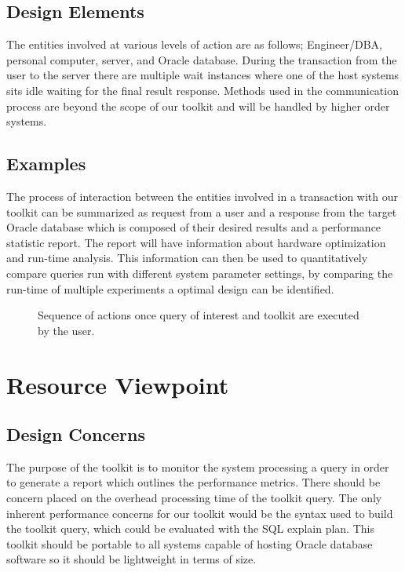 \documentclass[draftclsnofoot, onecolumn, compsoc, 10pt]{IEEEtran}
\begin{document}
\subsection{Design Elements}
The entities involved at various levels of action are as follows; Engineer/DBA, personal computer, server, and Oracle database.
During the transaction from the user to the server there are multiple wait instances where one of the host systems sits idle waiting for the final result response.
Methods used in the communication process are beyond the scope of our toolkit and will be handled by higher order systems.

\subsection{Examples}
The process of interaction between the entities involved in a transaction with our toolkit can be summarized as request from a user and a response from the target Oracle database which is composed of their desired results and a performance statistic report.
The report will have information about hardware optimization and run-time analysis.
This information can then be used to quantitatively compare queries run with different system parameter settings, by comparing the run-time of multiple experiments a optimal design can be identified. 



\begin{figure}[h!]
  \caption{Sequence of actions once query of interest and toolkit are executed by the user.}
\end{figure}

\section{Resource Viewpoint}
\subsection{Design Concerns}
The purpose of the toolkit is to monitor the system processing a query in order to generate a report which outlines the performance metrics.
There should be concern placed on the overhead processing time of the toolkit query.
The only inherent performance concerns for our toolkit would be the syntax used to build the toolkit query, which could be evaluated with the SQL explain plan. This toolkit should be portable to all systems capable of hosting Oracle database software so it should be lightweight in terms of size. 
\end{document}
